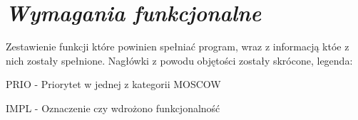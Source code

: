 \documentclass[a4paper,10pt]{report}
\newcommand{\customstylechapter}[1]{\large{\textit{#1}}}
\begin{document}
\chapter{\customstylechapter{Wymagania funkcjonalne}}
{Zestawienie funkcji które powinien spełniać program, wraz z informacją któe 
z nich zostały spełnione. Nagłówki z powodu objętości zostały skrócone, legenda:}

{PRIO - Priorytet w jednej z kategorii MOSCOW \cite{MOSCOW}}

{IMPL - Oznaczenie czy wdrożono funkcjonalność}

\end{document}
